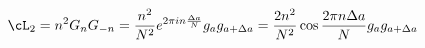 \begin{equation}
\cL_2 = n^2 G_n G_{- n} = \frac{n^2}{N^2} e^{2 \pi i n
\frac{\Delta a}{N}} g_a g_{a + \Delta a} = \frac{2 n^2}{N^2} \cos
\frac{2 \pi n \Delta a}{N} g_a g_{a + \Delta a}
\end{equation} 
